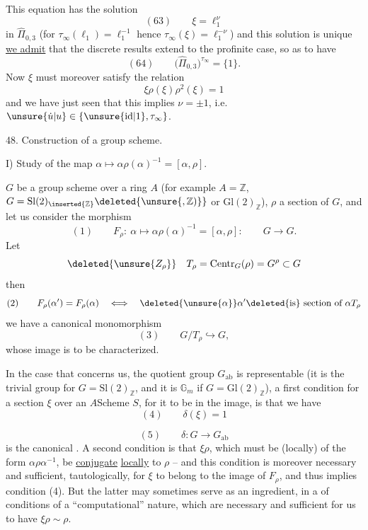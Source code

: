 
This equation has the solution
\[
(63)\qquad\xi=\ell_1^\nu
\]
in $\widehat\Pi_{0,3}$ (for $\tau_\infty(\ell_1)=\ell_1^{-1}$
hence $\tau_\infty(\xi)=\ell_1^{-\nu}$)
and this solution is unique \uline{ we admit}
that the discrete results extend to the profinite case,
so as to have
\[
(64)\qquad\bigl(\widehat\Pi_{0,3}\bigr)^{\tau_\infty}=\{1\}.
\]
Now $\xi$ must moreover satisfy the relation
\[
\xi\rho(\xi)
\rho^2(\xi)=1
\]
and we have just seen that this implies
$\nu=\pm1$, i.e.
$\unsure{\dot u|u}\in\{\unsure{\mathrm{id}|1},\tau_\infty\}$.


48. Construction of a group scheme.

I) Study of the map $\alpha\longmapsto
\alpha\rho(\alpha)^{-1}=[\alpha,\rho]$.

 $G$ be a group scheme over a ring
$A$ (for example $A=\mathbb Z$, $G=\mathrm{Sl}(2)_{\inserted{\mathbb Z}}
\deleted{\unsure{,\mathbb Z)}}$ or $\mathrm{Gl}(2)_{\mathbb Z}$),
$\rho$ a section of $G$, and let us consider the morphism
\[
(1)\qquad
F_\rho:\ \alpha\longmapsto\alpha\rho(\alpha)^{-1}
=[\alpha,\rho]:\qquad G\longrightarrow G.
\]
Let
\[
\deleted{\unsure{Z_\rho}}\quad
T_\rho
=\mathrm{Centr}_G(\rho)=G^\rho\subset G
\]
then
\[
(2)\qquad
F_\rho(\alpha')=F_\rho(\alpha)\quad\Longleftrightarrow\quad
\deleted{\unsure{\alpha}}\alpha'\deleted{\text{is}}
\text{ section of }\alpha T_\rho
\]
 we have a canonical monomorphism
\[
(3)\qquad
G/T_\rho\hookrightarrow G,
\]
whose image is to be characterized.

In the case that concerns us, the quotient group $G_{\mathrm{ab}}$
is representable (it is the trivial group for
$G=\mathrm{Sl}(2)_{\mathbb Z}$, and it is $\mathbb G_m$ if
$G=\mathrm{Gl}(2)_{\mathbb Z}$),
 a first condition for
a section $\xi$
over an $A$Scheme $S$,  for it
to be in the image, is that we have
\[
(4)\qquad\delta(\xi)=1
\]

\[
(5)\qquad \delta:G\longrightarrow G_{\mathrm{ab}}
\]
is the canonical . A second condition is that $\xi\rho$, which must be (locally) of the form $\alpha\rho\alpha^{-1}$, be \uline{conjugate} \uline{locally} to $\rho$ -- and this condition is moreover necessary and sufficient, tautologically, for $\xi$ to belong to the image of $F_\rho$, and thus implies condition (4). But the latter may sometimes serve as an ingredient,  in a  of conditions of a ``computational'' nature, which are necessary and sufficient for us to have $\xi\rho\sim\rho$.

